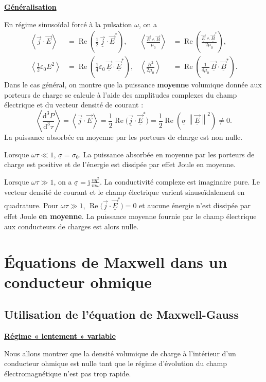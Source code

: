 \documentclass[11pt,a4paper]{article}
\newif\ifinexample
\newcommand{\dd}{\mathrm d}
\newcommand{\titr}[1]{\par\ifinexample\else\Needspace{4\baselineskip}\fi\textbf{\underline{#1}}\par\nopagebreak[3]}
\newcommand{\vj}{\vec j}\newcommand{\vE}{\vec E}\newcommand{\vB}{\vec B}
\newcommand{\eps}{\varepsilon_0}\newcommand{\E}{\vec E}\newcommand{\dS}{\dd\vec S}\newcommand{\dM}{\dd\vec M}
\newcommand{\cx}[1]{\underline{#1}}
\newcommand{\av}[1]{\left\langle #1\right\rangle}
\newcommand{\norme}[1]{\left\lVert #1\right\rVert}
\newcommand{\imag}{\mathrm{j}}
\newcommand{\partre}{\operatorname{Re}}
\newcommand{\densP}{\frac{\dd^3 P}{\dd^3\!\tau}}
\begin{document}
\titr{Généralisation}
En régime sinusoïdal forcé à la pulsation \(\omega\), on a
\begin{align*}
 \av{\vj\cdot\E}
  &=\partre\!\left(\tfrac12\,\cx{\vj}\cdot\cx{\E}^{*}\right),&
 \av{\frac{\E\wedge\vB}{\mu_0}}
  &=\partre\!\left(\frac{\cx{\E}\wedge\cx{\vB}^{*}}{2\mu_0}\right),\\[3pt]
 \av{\tfrac12\eps E^2}
  &=\partre\!\left(\tfrac14\eps\,\cx{\E}\cdot\cx{\E}^{*}\right),&
 \av{\frac{B^2}{2\mu_0}}
  &=\partre\!\left(\frac{1}{4\mu_0}\,\cx{\vB}\cdot\cx{\vB}^{*}\right).
\end{align*}
Dans le cas général, on montre que la puissance \textbf{moyenne} volumique donnée aux
porteurs de charge se calcule à l'aide des amplitudes complexes du champ électrique et du
vecteur densité de courant :
\[
 \av{\densP}=\av{\vj\cdot\E}
  =\frac12\partre\bigl(\cx{\vj}\cdot\cx{\E}^{*}\bigr)
  =\frac12\partre\!\left(\cx{\sigma}\,\norme{\cx{\E}}^2\right)\ne0 .
\]
La puissance absorbée en moyenne par les porteurs de charge est non nulle.

Lorsque \(\omega\tau\ll1\), \(\cx{\sigma}=\sigma_0\). La puissance absorbée en moyenne par
les porteurs de charge est positive et de l'énergie est dissipée par effet Joule en moyenne.

Lorsque \(\omega\tau\gg1\), on a \(\displaystyle\cx{\sigma}=\imag\,\frac{nq^2}{m\omega}\).
La conductivité complexe est imaginaire pure. Le vecteur densité de courant et le champ
électrique varient sinusoïdalement en quadrature. Pour \(\omega\tau\gg1\),
\(\partre\bigl(\cx{\vj}\cdot\cx{\E}^{*}\bigr)=0\) et aucune énergie n'est dissipée par
effet Joule \textbf{en moyenne}. La puissance moyenne fournie par le champ électrique aux
conducteurs de charges est alors nulle.\label{verif:joule}

\section{Équations de Maxwell dans un conducteur ohmique}\label{sec:maxwell}
\subsection{Utilisation de l'équation de Maxwell-Gauss}\label{sec:gauss}
\titr{Régime « lentement » variable}
Nous allons montrer que la densité volumique de charge à l'intérieur d'un conducteur ohmique
est nulle tant que le régime d'évolution du champ électromagnétique n'est pas trop rapide.
\end{document}

